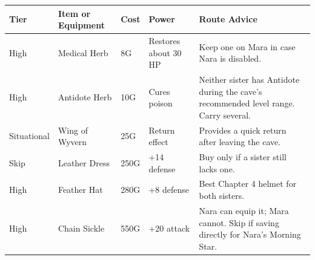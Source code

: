 \documentclass[
  american,
  10pt,
  letterpaper,
  oneside,
  open=any]{scrreprt}
\newcounter{none} %
\newenvironment{guidetable}{%
  \small\setstretch{1.0}%
  \setlength{\tabcolsep}{4pt}%
  \setlength{\LTpre}{8pt}\setlength{\LTpost}{10pt}%
  \renewcommand{\arraystretch}{1.16}%
}{ }
\begin{document}
\begin{guidetable}

{\def\LTcaptype{none} %
\begin{longtable}[]{@{}
  >{\raggedright\arraybackslash}p{}
  >{\raggedright\arraybackslash}p{}
  >{\raggedleft\arraybackslash}p{}
  >{\raggedleft\arraybackslash}p{}
  >{\raggedright\arraybackslash}p{}@{}}
\toprule\noalign{}
\begin{minipage}[b]{\linewidth}\raggedright
\color{GuideGreen}\bfseries Tier
\end{minipage} & \begin{minipage}[b]{\linewidth}\raggedright
\color{GuideGreen}\bfseries Item or Equipment
\end{minipage} & \begin{minipage}[b]{\linewidth}\raggedleft
\color{GuideGreen}\bfseries Cost
\end{minipage} & \begin{minipage}[b]{\linewidth}\raggedleft
\color{GuideGreen}\bfseries Power
\end{minipage} & \begin{minipage}[b]{\linewidth}\raggedright
\color{GuideGreen}\bfseries Route Advice
\end{minipage} \\
\midrule\noalign{}
\endhead
\bottomrule\noalign{}
\endlastfoot
High & Medical Herb & 8G & Restores about 30 HP & Keep one on Mara in
case Nara is disabled. \\
High & Antidote Herb & 10G & Cures poison & Neither sister has Antidote
during the cave's recommended level range. Carry several. \\
Situational & Wing of Wyvern & 25G & Return effect & Provides a quick
return after leaving the cave. \\
Skip & Leather Dress & 250G & +14 defense & Buy only if a sister still
lacks one. \\
High & Feather Hat & 280G & +8 defense & Best Chapter 4 helmet for both
sisters. \\
High & Chain Sickle & 550G & +20 attack & Nara can equip it; Mara
cannot. Skip if saving directly for Nara's Morning Star. \\
\end{longtable}
}

\end{guidetable}
\end{document}
